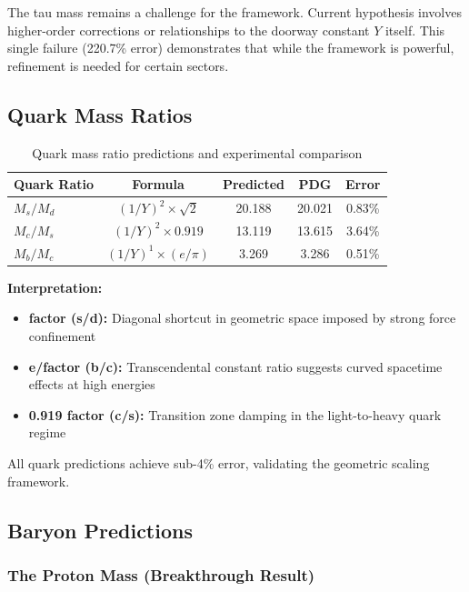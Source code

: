\documentclass[11pt,twocolumn]{article}
\begin{document}
The tau mass remains a challenge for the framework. Current hypothesis involves higher-order corrections or relationships to the doorway constant $Y$ itself. This single failure (220.7\% error) demonstrates that while the framework is powerful, refinement is needed for certain sectors.

\subsection{Quark Mass Ratios}

\begin{table}[H]
\centering
\caption{Quark mass ratio predictions and experimental comparison}
\begin{tabular}{lcccc}
\toprule
\textbf{Quark Ratio} & \textbf{Formula} & \textbf{Predicted} & \textbf{PDG} & \textbf{Error} \\
\midrule
$M_s/M_d$ & $(1/Y)^2 \times \sqrt{2}$ & 20.188 & 20.021 & 0.83\% \\
$M_c/M_s$ & $(1/Y)^2 \times 0.919$ & 13.119 & 13.615 & 3.64\% \\
$M_b/M_c$ & $(1/Y)^1 \times (e/\pi)$ & 3.269 & 3.286 & 0.51\% \\
\bottomrule
\end{tabular}
\end{table}

\textbf{Interpretation:}

\begin{itemize}
\item \textbf{ factor (s/d):} Diagonal shortcut in geometric space imposed by strong force confinement
\item \textbf{e/\pi  factor (b/c):} Transcendental constant ratio suggests curved spacetime effects at high energies
\item \textbf{0.919 factor (c/s):} Transition zone damping in the light-to-heavy quark regime
\end{itemize}

All quark predictions achieve sub-4\% error, validating the geometric scaling framework.

\subsection{Baryon Predictions}

\subsubsection{The Proton Mass (Breakthrough Result)}
\end{document}
